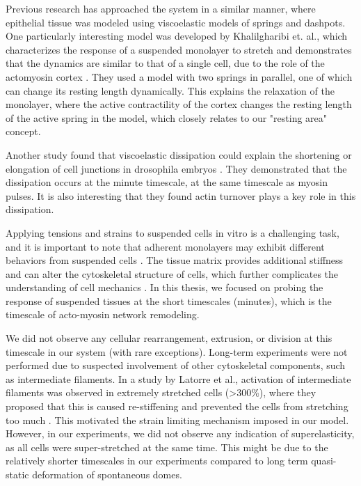 Previous research has approached the system in a similar manner, where epithelial tissue was modeled using viscoelastic models of springs and dashpots. One particularly interesting model was developed by Khalilgharibi et. al., which characterizes the response of a suspended monolayer to stretch and demonstrates that the dynamics are similar to that of a single cell, due to the role of the actomyosin cortex \cite{khalilgharibi2019}. They used a model with two springs in parallel, one of which can change its resting length dynamically. This explains the relaxation of the monolayer, where the active contractility of the cortex changes the resting length of the active spring in the model, which closely relates to our "resting area" concept.

Another study found that viscoelastic dissipation could explain the shortening or elongation of cell junctions in drosophila embryos \cite{clement2017}. They demonstrated that the dissipation occurs at the minute timescale, at the same timescale as myosin pulses. It is also interesting that they found actin turnover plays a key role in this dissipation.

Applying tensions and strains to suspended cells in vitro is a challenging task, and it is important to note that adherent monolayers may exhibit different behaviors from suspended cells \cite{harris2012}. The tissue matrix provides additional stiffness and can alter the cytoskeletal structure of cells, which further complicates the understanding of cell mechanics \cite{humphrey2014, kechagia2019}. In this thesis, we focused on probing the response of suspended tissues at the short timescales (minutes), which is the timescale of acto-myosin network remodeling.

We did not observe any cellular rearrangement, extrusion, or division at this timescale in our system (with rare exceptions). Long-term experiments were not performed due to suspected involvement of other cytoskeletal components, such as intermediate filaments. In a study by Latorre et al., activation of intermediate filaments was observed in extremely stretched cells (>300\%), where they proposed that this is caused re-stiffening and prevented the cells from stretching too much  \cite{latorre2018}. This motivated the strain limiting mechanism imposed in our model. However, in our experiments, we did not observe any indication of superelasticity, as all cells were super-stretched at the same time. This might be due to the relatively shorter timescales in our experiments compared to long term quasi-static deformation of spontaneous domes.

